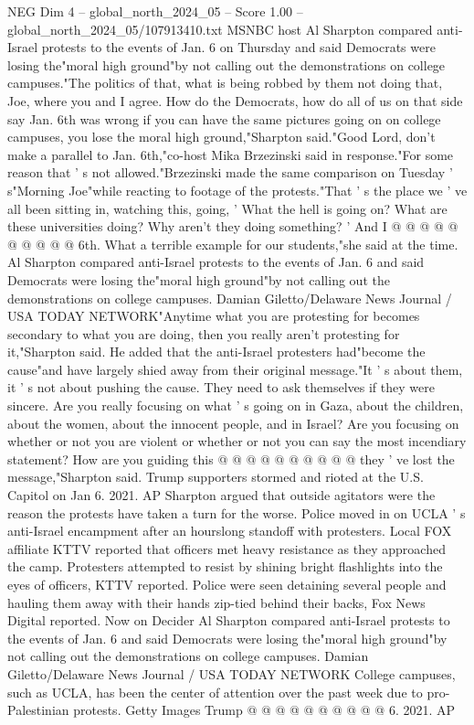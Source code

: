 \begin{textsample}{NEG Dim 4 – global\_north\_2024\_05 – Score 1.00 – global\_north\_2024\_05/107913410.txt}  \label{ex:f4_neg_128}
MSNBC host Al Sharpton compared anti-Israel protests to the events of Jan. 6 on Thursday and said Democrats were losing the"moral high ground"by not calling out the demonstrations on college campuses."The politics of that, what is being robbed by them not doing that, Joe, where you and I agree.
How do the Democrats, how do all of us on that side say Jan. 6th was wrong if you can have the same pictures going on on college campuses, you lose the moral high ground,"Sharpton said."Good Lord, don't make a parallel to Jan. 6th,"co-host Mika Brzezinski said in response."For some reason that ' s not allowed."Brzezinski made the same comparison on Tuesday ' s"Morning Joe"while reacting to footage of the protests."That ' s the place we ' ve all been sitting in, watching this, going, ' What the hell is going on?
What are these universities doing?
Why aren't they doing something? ' And I @ @ @ @ @ @ @ @ @ @ 6th.
What a terrible example for our students,"she said at the time.
Al Sharpton compared anti-Israel protests to the events of Jan. 6 and said Democrats were losing the"moral high ground"by not calling out the demonstrations on college campuses.
Damian Giletto/Delaware News Journal / USA TODAY NETWORK"Anytime what you are protesting for becomes secondary to what you are doing, then you really aren't protesting for it,"Sharpton said.
He added that the anti-Israel protesters had"become the cause"and have largely shied away from their original message."It ' s about them, it ' s not about pushing the cause.
They need to ask themselves if they were sincere.
Are you really focusing on what ' s going on in Gaza, about the children, about the women, about the innocent people, and in Israel?
Are you focusing on whether or not you are violent or whether or not you can say the most incendiary statement?
How are you guiding this @ @ @ @ @ @ @ @ @ @ they ' ve lost the message,"Sharpton said.
Trump supporters stormed and rioted at the U.S.
Capitol on Jan 6. 2021.
AP Sharpton argued that outside agitators were the reason the protests have taken a turn for the worse.
Police moved in on UCLA ' s anti-Israel encampment after an hourslong standoff with protesters.
Local FOX affiliate KTTV reported that officers met heavy resistance as they approached the camp.
Protesters attempted to resist by shining bright flashlights into the eyes of officers, KTTV reported.
Police were seen detaining several people and hauling them away with their hands zip-tied behind their backs, Fox News Digital reported.
Now on Decider Al Sharpton compared anti-Israel protests to the events of Jan. 6 and said Democrats were losing the"moral high ground"by not calling out the demonstrations on college campuses.
Damian Giletto/Delaware News Journal / USA TODAY NETWORK College campuses, such as UCLA, has been the center of attention over the past week due to pro-Palestinian protests.
Getty Images Trump @ @ @ @ @ @ @ @ @ @ 6. 2021.
AP

\end{textsample}
